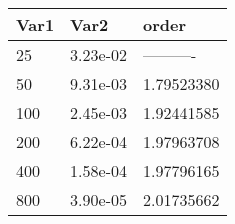 \begin{tabular}{lll}
Var1 & Var2 & order \\ 
\hline 
25 & 3.23e-02 & ---------- \\ 
50 & 9.31e-03 & 1.79523380 \\ 
100 & 2.45e-03 & 1.92441585 \\ 
200 & 6.22e-04 & 1.97963708 \\ 
400 & 1.58e-04 & 1.97796165 \\ 
800 & 3.90e-05 & 2.01735662 \\ 
\hline 
\end{tabular}